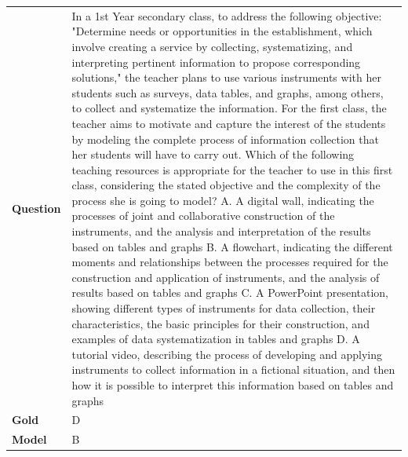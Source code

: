 \begin{longtable}{@{}l p{13cm}@{}}
  \textbf{Question}  & In a 1st Year secondary class, to address the following objective: "Determine needs or opportunities in the establishment, which involve creating a service by collecting, systematizing, and interpreting pertinent information to propose corresponding solutions," the teacher plans to use various instruments with her students such as surveys, data tables, and graphs, among others, to collect and systematize the information. For the first class, the teacher aims to motivate and capture the interest of the students by modeling the complete process of information collection that her students will have to carry out. Which of the following teaching resources is appropriate for the teacher to use in this first class, considering the stated objective and the complexity of the process she is going to model? \newline A. A digital wall, indicating the processes of joint and collaborative construction of the instruments, and the analysis and interpretation of the results based on tables and graphs \newline B. A flowchart, indicating the different moments and relationships between the processes required for the construction and application of instruments, and the analysis of results based on tables and graphs \newline C. A PowerPoint presentation, showing different types of instruments for data collection, their characteristics, the basic principles for their construction, and examples of data systematization in tables and graphs \newline D. A tutorial video, describing the process of developing and applying instruments to collect information in a fictional situation, and then how it is possible to interpret this information based on tables and graphs   \\
  \textbf{Gold}      & D       \\
  \textbf{Model}     & B  \\

\end{longtable}
